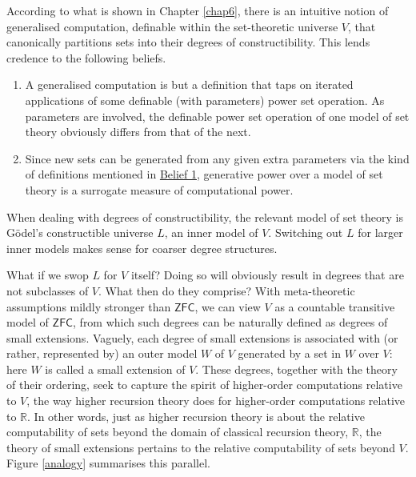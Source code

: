 \documentclass[12pt, twoside]{memoir}
\numberwithin{equation}{section}
\theoremstyle{definition}
\theoremstyle{remark}
\theoremstyle{definition}
\theoremstyle{definition}
\theoremstyle{definition}
\theoremstyle{remark}
\begin{document}
According to what is shown in Chapter \ref{chap6}, there is an intuitive notion of generalised computation, definable within the set-theoretic universe $V$, that canonically partitions sets into their degrees of constructibility. This lends credence to the following beliefs.
\begin{enumerate}[label=Belief \arabic*:, leftmargin=60pt]
    \item\label{b1} A generalised computation is but a definition that taps on iterated applications of some definable (with parameters) power set operation. As parameters are involved, the definable power set operation of one model of set theory obviously differs from that of the next. 
    \item Since new sets can be generated from any given extra parameters via the kind of definitions mentioned in \hyperref[b1]{Belief 1}, generative power over a model of set theory is a surrogate measure of computational power.
\end{enumerate}
When dealing with degrees of constructibility, the relevant model of set theory is G\"{o}del's constructible universe $L$, an inner model of $V$. Switching out $L$ for larger inner models makes sense for coarser degree structures.

What if we swop $L$ for $V$ itself? Doing so will obviously result in degrees that are not subclasses of $V$. What then do they comprise? With meta-theoretic assumptions mildly stronger than $\mathsf{ZFC}$, we can view $V$ as a countable transitive model of $\mathsf{ZFC}$, from which such degrees can be naturally defined as degrees of small extensions. Vaguely, each degree of small extensions is associated with (or rather, represented by) an outer model $W$ of $V$ generated by a set in $W$ over $V$: here $W$ is called a small extension of $V$. These degrees, together with the theory of their ordering, seek to capture the spirit of higher-order computations relative to $V$, the way higher recursion theory does for higher-order computations relative to $\mathbb{R}$. In other words, just as higher recursion theory is about the relative computability of sets beyond the domain of classical recursion theory, $\mathbb{R}$, the theory of small extensions pertains to the relative computability of sets beyond $V$. Figure \ref{analogy} summarises this parallel.
\end{document}
